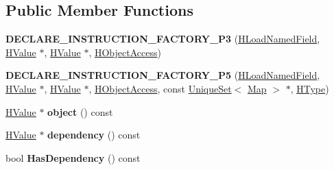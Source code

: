 \subsection*{Public Member Functions}
\begin{DoxyCompactItemize}
\item 
{\bfseries D\+E\+C\+L\+A\+R\+E\+\_\+\+I\+N\+S\+T\+R\+U\+C\+T\+I\+O\+N\+\_\+\+F\+A\+C\+T\+O\+R\+Y\+\_\+\+P3} (\hyperlink{classv8_1_1internal_1_1_h_load_named_field}{H\+Load\+Named\+Field}, \hyperlink{classv8_1_1internal_1_1_h_value}{H\+Value} $\ast$, \hyperlink{classv8_1_1internal_1_1_h_value}{H\+Value} $\ast$, \hyperlink{classv8_1_1internal_1_1_h_object_access}{H\+Object\+Access})\hypertarget{classv8_1_1internal_1_1_h_load_named_field_a0308cc1729328efb67277dae54ccb86e}{}\label{classv8_1_1internal_1_1_h_load_named_field_a0308cc1729328efb67277dae54ccb86e}

\item 
{\bfseries D\+E\+C\+L\+A\+R\+E\+\_\+\+I\+N\+S\+T\+R\+U\+C\+T\+I\+O\+N\+\_\+\+F\+A\+C\+T\+O\+R\+Y\+\_\+\+P5} (\hyperlink{classv8_1_1internal_1_1_h_load_named_field}{H\+Load\+Named\+Field}, \hyperlink{classv8_1_1internal_1_1_h_value}{H\+Value} $\ast$, \hyperlink{classv8_1_1internal_1_1_h_value}{H\+Value} $\ast$, \hyperlink{classv8_1_1internal_1_1_h_object_access}{H\+Object\+Access}, const \hyperlink{classv8_1_1internal_1_1_unique_set}{Unique\+Set}$<$ \hyperlink{classv8_1_1internal_1_1_map}{Map} $>$ $\ast$, \hyperlink{classv8_1_1internal_1_1_h_type}{H\+Type})\hypertarget{classv8_1_1internal_1_1_h_load_named_field_ab1509ba4a1208c7e3865b00d2aac6c70}{}\label{classv8_1_1internal_1_1_h_load_named_field_ab1509ba4a1208c7e3865b00d2aac6c70}

\item 
\hyperlink{classv8_1_1internal_1_1_h_value}{H\+Value} $\ast$ {\bfseries object} () const \hypertarget{classv8_1_1internal_1_1_h_load_named_field_a5406a6047dcc92a01bc7dff3aa575c5c}{}\label{classv8_1_1internal_1_1_h_load_named_field_a5406a6047dcc92a01bc7dff3aa575c5c}

\item 
\hyperlink{classv8_1_1internal_1_1_h_value}{H\+Value} $\ast$ {\bfseries dependency} () const \hypertarget{classv8_1_1internal_1_1_h_load_named_field_a5a494bde9b233aa36634304ea6564b54}{}\label{classv8_1_1internal_1_1_h_load_named_field_a5a494bde9b233aa36634304ea6564b54}

\item 
bool {\bfseries Has\+Dependency} () const \hypertarget{classv8_1_1internal_1_1_h_load_named_field_a7316324a10ef6d27bbc0c3e464f51003}{}\label{classv8_1_1internal_1_1_h_load_named_field_a7316324a10ef6d27bbc0c3e464f51003}


\end{DoxyCompactItemize}
